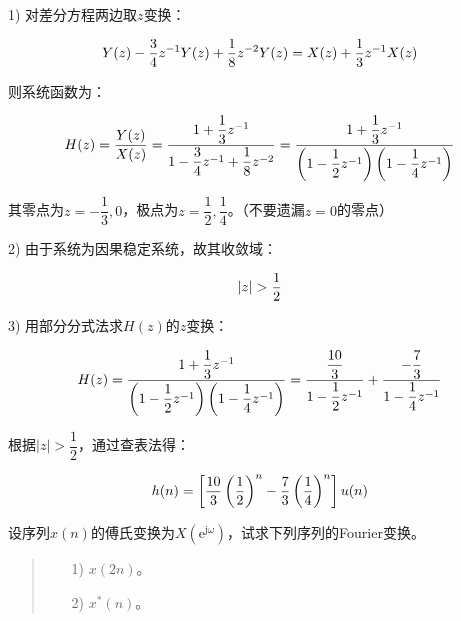 \documentclass[cn, hazy, blue, normal, 14pt]{elegantnote}
\begin{document}
\begin{solution}[print=true]
    
1) 对差分方程两边取$z$变换：

\begin{equation}
\notag
    Y(z)-\frac{3}{4}z^{-1}Y(z)+\frac{1}{8}z^{-2}Y(z)=X(z)+\frac{1}{3}z^{-1}X(z)
\end{equation}

则系统函数为：

\begin{equation}
\notag
    H(z)=\dfrac{Y(z)}{X(z)}=\dfrac{1+\dfrac{1}{3}z^{-1}}{1-\dfrac{3}{4}z^{-1}+\dfrac{1}{8}z^{-2}}=\dfrac{1+\dfrac{1}{3}z^{-1}}{\left(1-\dfrac{1}{2}z^{-1}\right)\left(1-\dfrac{1}{4}z^{-1}\right)}
\end{equation}

其零点为$z=-\dfrac{1}{3}, 0$，极点为$z=\dfrac{1}{2}, \dfrac{1}{4}$。（不要遗漏$z=0$的零点）

2) 由于系统为因果稳定系统，故其收敛域：

\begin{equation}
    \notag
    |z|>\frac{1}{2}
\end{equation}

3) 用部分分式法求$H(z)$的$z$变换：

\begin{equation}
    \notag
    H(z)=\dfrac{1+\dfrac{1}{3}z^{-1}}{\left(1-\dfrac{1}{2}z^{-1}\right)\left(1-\dfrac{1}{4}z^{-1}\right)}=\dfrac{\dfrac{10}{3}}{1-\dfrac{1}{2}z^{-1}}+\dfrac{-\dfrac{7}{3}}{1-\dfrac{1}{4}z^{-1}}
\end{equation}

根据$|z|>\dfrac{1}{2}$，通过查表法得：

\begin{equation}
    \notag
    h(n)=\left[\dfrac{10}{3}\left(\dfrac{1}{2}\right)^n-\dfrac{7}{3}\left(\dfrac{1}{4}\right)^n\right]u(n)
\end{equation}

\end{solution}

\begin{exercise}

设序列$x(n)$的傅氏变换为$X\left(\text{e}^{\text{j}\omega}\right)$，试求下列序列的Fourier变换。

\begin{quote}
\begin{itemize}
    \item[1)] $x(2n)$。
    \item[2)] $x^*(n)$。
\end{itemize}
\end{quote}

\end{exercise}
\end{document}
